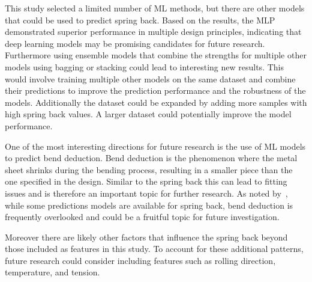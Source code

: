 This study selected a limited number of \ac{ML} methods, but there are other models that could be used to
predict spring back.
Based on the results, the \ac{MLP} demonstrated superior performance in multiple design principles, indicating that
deep learning models may be promising candidates for future research.
Furthermore using ensemble models that combine the strengths for multiple other models using bagging or stacking could
lead to interesting new results.
This would involve training multiple other models on the same dataset and combine their predictions to improve the
prediction performance and the robustness of the models.
Additionally the dataset could be expanded by adding more samples with high spring back values.
A larger dataset could potentially improve the model performance.

One of the most interesting directions for future research is the use of \ac{ML} models to predict bend deduction.
Bend deduction is the phenomenon where the metal sheet shrinks during the bending process, resulting in a smaller
piece than the one specified in the design.
Similar to the spring back this can lead to fitting issues and is therefore an important topic for further research.
As noted by~\cite{strano2017fusion}, while some predictions models are available for spring back, bend deduction is
frequently overlooked and could be a fruitful topic for future investigation.

Moreover there are likely other factors that influence the spring back beyond those included as features in this study.
To account for these additional patterns, future research could consider including features such as rolling
direction, temperature, and tension.
